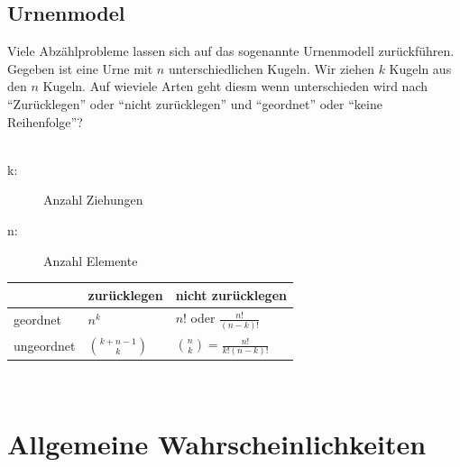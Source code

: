 \documentclass[10pt]{article}
\newtheorem[M]{definition}{Def.}
\newtheorem[M]{satz}{Satz}
\numberwithin{equation}{section}
\begin{document}
\subsection{Urnenmodel}
Viele Abzählprobleme lassen sich auf das sogenannte Urnenmodell zurückführen. Gegeben ist eine Urne mit $n$ unterschiedlichen Kugeln. Wir ziehen $k$ Kugeln aus den $n$ Kugeln. Auf wieviele Arten geht diesm wenn unterschieden wird nach "`Zurücklegen"' oder "`nicht zurücklegen"' und "`geordnet"' oder "`keine Reihenfolge"'? \\
\\
\begin{description}
	\item[k:] Anzahl Ziehungen
	\item[n:] Anzahl Elemente
\end{description}
\begin{tabular}{l|l|l}
 &zur\"{u}cklegen&nicht zur\"{u}cklegen\\\hline
 geordnet&$n^k$&$n!$ oder $\frac{n!}{(n-k)!}$\\\hline
 ungeordnet&$\binom{k+n-1}{k}$&$\binom{n}{k}=\frac{n!}{k!(n-k)!}$
\end{tabular}\\

\newpage
\section{Allgemeine Wahrscheinlichkeiten}
\end{document}
